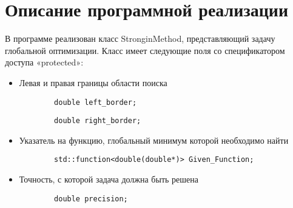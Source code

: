 \documentclass{report}
\begin{document}
\section*{Описание программной реализации}
В программе реализован класс StronginMethod, представляющий задачу глобальной оптимизации. Класс имеет следующие поля со спецификатором доступа «protected»:\par
\begin{itemize}
	\item Левая и правая границы области поиска\par
	\begin{lstlisting}
		double left_border;
	\end{lstlisting}\par
	\begin{lstlisting}
		double right_border;
	\end{lstlisting}\par
	 \item Указатель на функцию, глобальный минимум которой необходимо найти \par
	\begin{lstlisting}
		std::function<double(double*)> Given_Function;
	\end{lstlisting}\par
	\item Точность, с которой задача должна быть решена \par
	\begin{lstlisting}
		double precision;
	\end{lstlisting}\par
\end{itemize}
\end{document}
